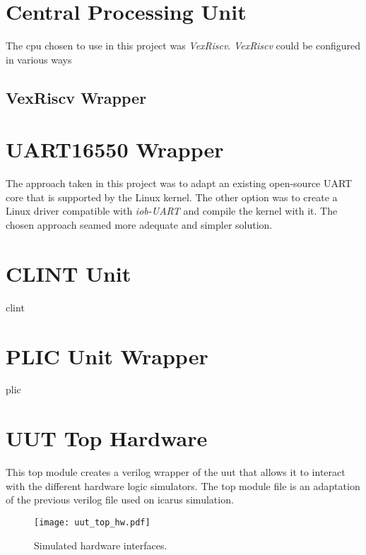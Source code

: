 \section{Central Processing Unit}
The \acrshort{cpu} chosen to use in this project was \textit{VexRiscv}. \textit{VexRiscv} could be configured in various ways
\subsection{VexRiscv Wrapper}

\section{UART16550 Wrapper}
The approach taken in this project was to adapt an existing open-source UART core that is supported by the Linux kernel. The other option was to create a Linux driver compatible with \textit{iob-UART} and compile the kernel with it. The chosen approach seamed more adequate and simpler solution.

\section{CLINT Unit}
\acrshort{clint}

\section{PLIC Unit Wrapper}
\acrshort{plic} 

\section{UUT Top Hardware}
This top module creates a verilog wrapper of the \acrfull{uut} that allows it to interact with the different hardware logic simulators. The top module file is an adaptation of the previous verilog file used on icarus simulation.

\begin{figure}[!ht]
    \centering
    \texttt{[image: uut\_top\_hw.pdf]}
    \caption{Simulated hardware interfaces.}
    \label{fig:uut_top_hw}
\end{figure}